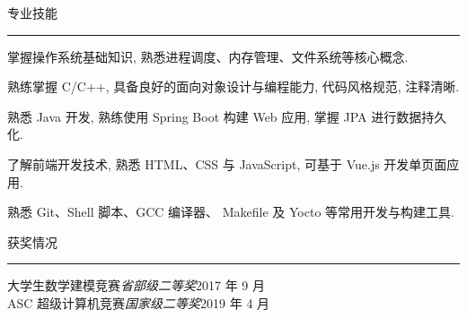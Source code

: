 \documentclass{cv} %
\renewenvironment{rSection}[1]{
\sectionskip
\textcolor{RoyalPurple}{\MakeUppercase{#1}}
\sectionlineskip
\hrule
\begin{list}{}{
\setlength{\leftmargin}{1.5em}
}
\item[]
}{
\end{list}
}
\begin{document}
\begin{rSection}{专业技能}
	\begin{rSubsection}{}{}{}{}
		\item 掌握操作系统基础知识, 熟悉进程调度、内存管理、文件系统等核心概念.
		\item 熟练掌握 C/C++, 具备良好的面向对象设计与编程能力, 代码风格规范, 注释清晰.
		\item 熟悉 Java 开发, 熟练使用 Spring Boot 构建 Web 应用, 掌握 JPA 进行数据持久化.
		\item 了解前端开发技术, 熟悉 HTML、CSS 与 JavaScript, 可基于 Vue.js 开发单页面应用.
		\item 熟悉 Git、Shell 脚本、GCC 编译器、 Makefile 及 Yocto 等常用开发与构建工具.
	\end{rSubsection}
\end{rSection}

\begin{rSection}{获奖情况} \itemsep -2pt
	{大学生数学建模竞赛}\hfill {\em 省部级二等奖}\hfill {2017 年 9 月} \\
	{ASC 超级计算机竞赛}\hfill {\em 国家级二等奖}\hfill {2019 年 4 月}
\end{rSection}
\end{document}
